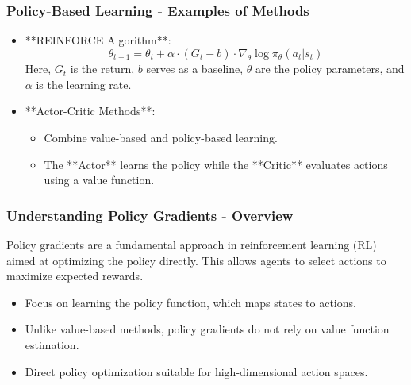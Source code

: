 \documentclass[aspectratio=169]{beamer}
\begin{document}
\begin{frame}[fragile]
    \frametitle{Policy-Based Learning - Examples of Methods}

    \begin{itemize}
        \item **REINFORCE Algorithm**:
        \begin{equation}
            \theta_{t+1} = \theta_t + \alpha \cdot (G_t - b) \cdot \nabla_\theta \log \pi_\theta(a_t|s_t)
        \end{equation}
        Here, $G_t$ is the return, $b$ serves as a baseline, $\theta$ are the policy parameters, and $\alpha$ is the learning rate.

        \item **Actor-Critic Methods**: 
        \begin{itemize}
            \item Combine value-based and policy-based learning.
            \item The **Actor** learns the policy while the **Critic** evaluates actions using a value function.
        \end{itemize}
    \end{itemize}
\end{frame}

\begin{frame}[fragile]
    \frametitle{Understanding Policy Gradients - Overview}
    Policy gradients are a fundamental approach in reinforcement learning (RL) aimed at optimizing the policy directly. This allows agents to select actions to maximize expected rewards.

    \begin{itemize}
        \item Focus on learning the policy function, which maps states to actions.
        \item Unlike value-based methods, policy gradients do not rely on value function estimation.
        \item Direct policy optimization suitable for high-dimensional action spaces.
    \end{itemize}
\end{frame}
\end{document}
